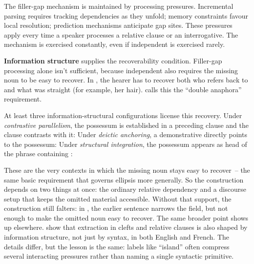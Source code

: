 The filler-gap mechanism is maintained by processing pressures. Incremental parsing requires tracking dependencies as they unfold; memory constraints favour local resolution; prediction mechanisms anticipate gap sites. These pressures apply every time a speaker processes a relative clause or an interrogative. The mechanism is exercised constantly, even if independent  is exercised rarely.

\textbf{Information structure} supplies the recoverability condition. Filler-gap processing alone isn't sufficient, because independent  also requires the missing noun to be easy to recover. In , the hearer has to recover both who  refers back to and what was straight (for example, her hair). \textcite{reynolds2024whose} calls this the \enquote{double anaphora} requirement.

At least three information-structural configurations license this recovery. Under \emph{contrastive parallelism}, the possessum is established in a preceding clause and the  clause contrasts with it:  Under \emph{deictic anchoring}, a demonstrative directly points to the possessum:  Under \emph{structural integration}, the possessum appears as head of the phrase containing : 

These are the very contexts in which the missing noun stays easy to recover~-- the same basic requirement that governs ellipsis more generally. So the construction depends on two things at once: the ordinary relative dependency and a discourse setup that keeps the omitted material accessible. Without that support, the construction still falters: in \odd{}, the earlier sentence narrows the field, but not enough to make the omitted noun easy to recover. The same broader point shows up elsewhere. \textcite{winckel2025ldds} show that extraction in clefts and relative clauses is also shaped by information structure, not just by syntax, in both English and French. The details differ, but the lesson is the same: labels like \enquote{island} often compress several interacting pressures rather than naming a single syntactic primitive.

